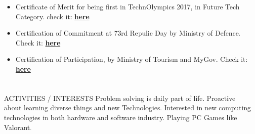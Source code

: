 \documentclass{my_cv}
\begin{document}
\begin{multicols}{2}
\begin{itemize}[noitemsep]
    \item Certificate of Merit for being first in TechnOlympics 2017, in Future Tech Category.
    check it: \textbf{\href{https://drive.google.com/file/d/1RLxo1emzGHALReSLDn7UjfB2_2hTYwOW/view}{here}}
    \item Certification of Commitment at 73rd Repulic Day by Ministry of Defence. Check it: \textbf{\href{https://drive.google.com/file/d/19l8o8HjbIlwEPfwosTMTENgxJ1geFbsB/view?usp=sharing}{here}}
    \item Certification of Participation, by Ministry of Tourism and MyGov. Check it: \textbf{\href{https://drive.google.com/file/d/10gOOfH7SBqizZOaP-F6VMnyDdtaQRh1v/view?usp=sharing}{here}}
\end{itemize}

\section{\faSoccerBallO}{ACTIVITIES / INTERESTS}
Problem solving is daily part of life.
Proactive about learning diverse things and new Technologies.
Interested in new computing technologies in both hardware and software industry.
Playing PC Games like Valorant.
\end{multicols}
\end{document}
